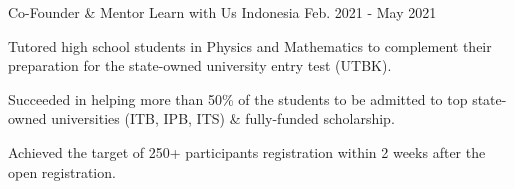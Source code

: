 

\begin{cventries}

  \cventry
    {Co-Founder \& Mentor} %
    {Learn with Us} %
    {Indonesia} %
    {Feb. 2021 - May 2021} %
    {
      \begin{cvitems} %
        \item {Tutored high school students in Physics and Mathematics to complement their preparation for the state-owned university entry test (UTBK).}
        \item {Succeeded in helping more than 50\% of the students to be admitted to top state-owned universities (ITB, IPB, ITS) \& fully-funded scholarship.}
        \item {Achieved the target of 250+ participants registration within 2 weeks after the open registration.}
      \end{cvitems}
    }

\end{cventries}